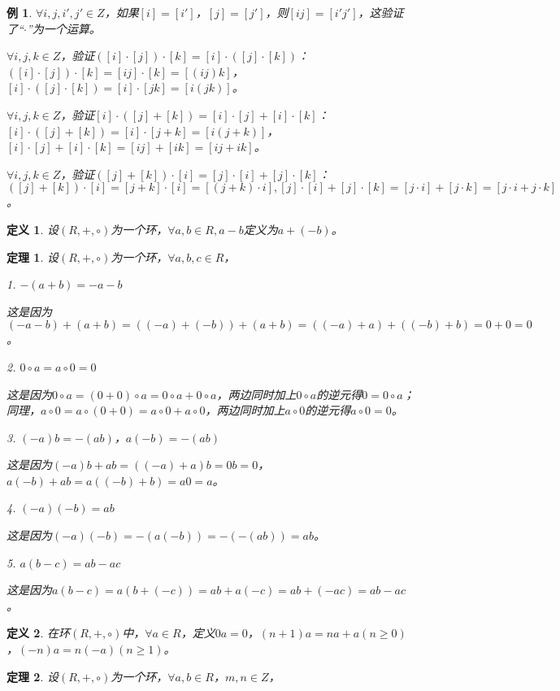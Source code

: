 \documentclass{article}
\newtheorem{Def}{定义}
\newtheorem{Thm}{定理}
\newtheorem*{Example}{例}
\begin{document}
\begin{CJK*}{UTF8}{gbsn}
\begin{Example}
    $\forall i,j,i',j'\in Z$，如果$[i]=[i']$，$[j]=[j']$，则$[ij]=[i'j']$，这验证了“$\cdot$”为一个运算。
  
    $\forall i,j,k\in Z$，验证$([i]\cdot [j])\cdot [k]=[i]\cdot ([j]\cdot [k])$：$([i]\cdot [j])\cdot [k]=[ij]\cdot [k]=[(ij)k]$，$[i]\cdot ([j]\cdot [k])=[i]\cdot [jk]=[i(jk)]$。
  
  $\forall i,j,k\in Z$，验证$[i]\cdot ([j]+[k])=[i]\cdot [j] + [i]\cdot [k]$：$[i]\cdot([j]+[k])=[i]\cdot[j+k]=[i(j+k)]$，$[i]\cdot [j]+[i]\cdot [k]=[ij]+[ik]=[ij+ik]$。
  
  $\forall i,j,k\in Z$，验证$([j]+[k])\cdot [i]=[j]\cdot [i]+[j]\cdot [k]$：$([j]+[k])\cdot [i]=[j+k]\cdot[i]=[(j+k)\cdot i],[j]\cdot [i]+[j]\cdot [k]=[j\cdot i]+[j\cdot k]=[j\cdot i+j\cdot k]$。
  
  \end{Example}
  \begin{Def}
    设$(R,+,\circ)$为一个环，$\forall a,b\in R,a-b$定义为$a+(-b)$。
  \end{Def}
  \begin{Thm}
    设$(R,+,\circ)$为一个环，$\forall a,b,c\in R$，
  
    1. $-(a+b)=-a-b$
  
    这是因为$(-a-b)+(a+b)=((-a)+(-b))+(a+b)=((-a)+a)+((-b)+b)=0+0=0$。
  
    2. $0\circ a = a\circ 0 = 0$
  
    这是因为$0\circ a = (0+0)\circ a=0\circ a+0\circ a$，两边同时加上$0\circ a$的逆元得$0=0\circ a$；同理，$a\circ 0=a\circ (0+0)=a\circ 0 + a\circ 0$，两边同时加上$a\circ 0$的逆元得$a\circ 0=0$。
  
    3. $(-a)b = -(ab)$，$a(-b)=-(ab)$
  
    这是因为$(-a)b+ab=((-a)+a)b=0b=0$，$a(-b)+ab=a((-b)+b)=a0=a$。
  
  
    4. $(-a)(-b)=ab$
  
    这是因为$(-a)(-b)=-(a(-b))=-(-(ab))=ab$。
  
    5. $a(b-c)=ab-ac$
  
    这是因为$a(b-c)=a(b+(-c))=ab+a(-c)=ab+(-ac)=ab-ac$。
  \end{Thm}
  
  \begin{Def}
    在环$(R,+,\circ)$中，$\forall a\in R$，定义$0a=0$，$(n+1)a=na+a(n\geq 0)$，$(-n)a=n(-a)(n\geq 1)$。
  \end{Def}
  
  \begin{Thm}
    设$(R,+,\circ)$为一个环，$\forall a,b \in R$，$m, n \in Z$，
  

\end{Thm}
\end{CJK*}
\end{document}
